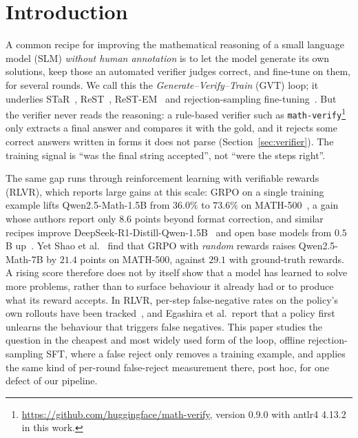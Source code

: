 \documentclass[runningheads]{llncs}
\begin{document}
\section{Introduction}
\label{sec:intro}

A common recipe for improving the mathematical reasoning of a small language
model (SLM) \emph{without human annotation} is to let the model generate its own
solutions, keep those an automated verifier judges correct, and fine-tune on
them, for several rounds. We call this the \emph{Generate--Verify--Train} (GVT)
loop; it underlies STaR~\cite{ref_star}, ReST~\cite{ref_rest},
ReST-EM~\cite{ref_restem} and rejection-sampling fine-tuning~\cite{ref_rft}.
But the verifier never reads the reasoning: a rule-based verifier such as
\texttt{math-verify}\footnote{\url{https://github.com/huggingface/math-verify},
version 0.9.0 with antlr4 4.13.2 in this work.} only extracts a final answer and
compares it with the gold, and it rejects some correct answers written in forms
it does not parse (Section~\ref{sec:verifier}). The training signal is ``was the
final string accepted'', not ``were the steps right''.

The same gap runs through reinforcement learning with verifiable rewards
(RLVR), which reports large gains at this scale: GRPO on a single training
example lifts Qwen2.5-Math-1.5B from $36.0\%$ to $73.6\%$ on
MATH-500~\cite{ref_oneshot}, a gain whose authors report only $8.6$ points
beyond format correction, and similar recipes improve
DeepSeek-R1-Distill-Qwen-1.5B~\cite{ref_openrs} and open base models from
$0.5$B up~\cite{ref_simplerl}. Yet Shao et al.~\cite{ref_spurious} find that
GRPO with \emph{random} rewards raises Qwen2.5-Math-7B by $21.4$ points on
MATH-500, against $29.1$ with ground-truth rewards. A rising score therefore
does not by itself show that a model has learned to solve more problems,
rather than to surface behaviour it already had or to produce what its reward
accepts. In RLVR, per-step false-negative rates on the policy's own rollouts
have been tracked~\cite{ref_delayplateau,ref_tinyv}, and Egashira et
al.\ report that a policy first unlearns the behaviour that triggers false
negatives. This paper studies the question in the cheapest and most widely
used form of the loop, offline rejection-sampling SFT, where a false reject
only removes a training example, and applies the same kind of per-round
false-reject measurement there, post hoc, for one defect of our pipeline.
\end{document}
